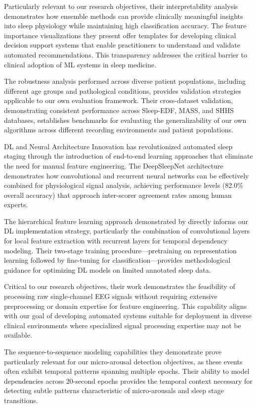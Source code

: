 \documentclass[a4paper,12pt,twoside]{article}
\begin{document}
Particularly relevant to our research objectives, their interpretability analysis demonstrates how ensemble methods can provide clinically meaningful insights into sleep physiology while maintaining high classification accuracy. The feature importance visualizations they present offer templates for developing clinical decision support systems that enable practitioners to understand and validate automated recommendations. This transparency addresses the critical barrier to clinical adoption of ML systems in sleep medicine.

The robustness analysis performed across diverse patient populations, including different age groups and pathological conditions, provides validation strategies applicable to our own evaluation framework. Their cross-dataset validation, demonstrating consistent performance across Sleep-EDF, MASS, and SHHS databases, establishes benchmarks for evaluating the generalizability of our own algorithms across different recording environments and patient populations.

DL and Neural Architecture Innovation \cite{supratak2017deepsleepnet} has revolutionized automated sleep staging through the introduction of end-to-end learning approaches that eliminate the need for manual feature engineering. The DeepSleepNet architecture demonstrates how convolutional and recurrent neural networks can be effectively combined for physiological signal analysis, achieving performance levels (82.0\% overall accuracy) that approach inter-scorer agreement rates among human experts.

The hierarchical feature learning approach demonstrated by \citeauthor{supratak2017deepsleepnet} directly informs our DL implementation strategy, particularly the combination of convolutional layers for local feature extraction with recurrent layers for temporal dependency modeling. Their two-stage training procedure—pretraining on representation learning followed by fine-tuning for classification—provides methodological guidance for optimizing DL models on limited annotated sleep data.

Critical to our research objectives, their work demonstrates the feasibility of processing raw single-channel EEG signals without requiring extensive preprocessing or domain expertise for feature engineering. This capability aligns with our goal of developing automated systems suitable for deployment in diverse clinical environments where specialized signal processing expertise may not be available.

The sequence-to-sequence modeling capabilities they demonstrate prove particularly relevant for our micro-arousal detection objectives, as these events often exhibit temporal patterns spanning multiple epochs. Their ability to model dependencies across 20-second epochs provides the temporal context necessary for detecting subtle patterns characteristic of micro-arousals and sleep stage transitions.
\end{document}
